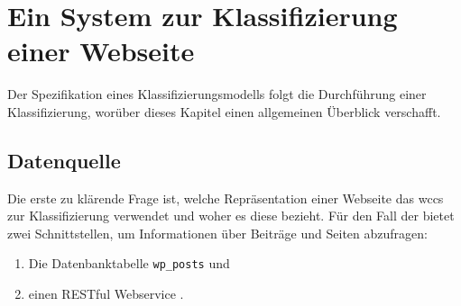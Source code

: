 \section{Ein System zur Klassifizierung einer Webseite}
    \label{section:conceptClassification}
    Der Spezifikation eines Klassifizierungsmodells folgt die Durchführung einer Klassifizierung,
    worüber dieses Kapitel einen allgemeinen Überblick verschafft.

    \subsection{Datenquelle}
        \label{section:conceptClassificationDataSource}
        Die erste zu klärende Frage ist, welche Repräsentation einer Webseite
        das \gls{wccs} zur Klassifizierung verwendet und woher es diese bezieht.
        Für den Fall der {\fernUni} bietet {\wordpress} zwei Schnittstellen,
        um Informationen über Beiträge und Seiten abzufragen:

        \begin{enumerate}
            \item Die Datenbanktabelle \texttt{wp\_posts} \cite[Kapitel "`Database Description"']{wordpress:codex} und
            \item einen RESTful Webservice \cite[Kapitel "`REST API Handbook"']{wordpress:codex}.
        \end{enumerate}

